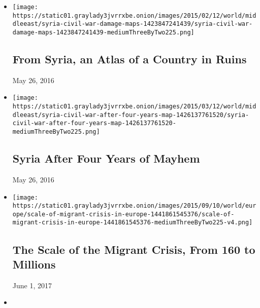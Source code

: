 \begin{itemize}
\item
  \href{https://www.nytimes3xbfgragh.onion/interactive/2015/02/12/world/middleeast/syria-civil-war-damage-maps.html}{}

  \texttt{[image: https://static01.graylady3jvrrxbe.onion/images/2015/02/12/world/middleeast/syria-civil-war-damage-maps-1423847241439/syria-civil-war-damage-maps-1423847241439-mediumThreeByTwo225.png]}

  \hypertarget{from-syria-an-atlas-of-a-country-in-ruins}{%
  \subsection{From Syria, an Atlas of a Country in
  Ruins}\label{from-syria-an-atlas-of-a-country-in-ruins}}

  May 26, 2016
\item
  \href{https://www.nytimes3xbfgragh.onion/interactive/2015/03/12/world/middleeast/syria-civil-war-after-four-years-map.html}{}

  \texttt{[image: https://static01.graylady3jvrrxbe.onion/images/2015/03/12/world/middleeast/syria-civil-war-after-four-years-map-1426137761520/syria-civil-war-after-four-years-map-1426137761520-mediumThreeByTwo225.png]}

  \hypertarget{syria-after-four-years-of-mayhem}{%
  \subsection{Syria After Four Years of
  Mayhem}\label{syria-after-four-years-of-mayhem}}

  May 26, 2016
\item
  \href{https://www.nytimes3xbfgragh.onion/interactive/2015/09/10/world/europe/scale-of-migrant-crisis-in-europe.html}{}

  \texttt{[image: https://static01.graylady3jvrrxbe.onion/images/2015/09/10/world/europe/scale-of-migrant-crisis-in-europe-1441861545376/scale-of-migrant-crisis-in-europe-1441861545376-mediumThreeByTwo225-v4.png]}

  \hypertarget{the-scale-of-the-migrant-crisis-from-160-to-millions}{%
  \subsection{The Scale of the Migrant Crisis, From 160 to
  Millions}\label{the-scale-of-the-migrant-crisis-from-160-to-millions}}

  June 1, 2017
\item
  \href{https://www.nytimes3xbfgragh.onion/interactive/2015/09/04/world/europe/europe-refugee-distribution.html}{}


\end{itemize}
